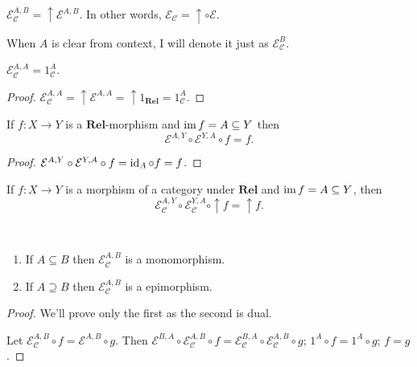 \begin{defn}
  $\mathcal{E}_{\mathcal{C}}^{A,B} = \uparrow \mathcal{E}^{A,B}$. In
  other words, $\mathcal{E}_{\mathcal{C}} = \uparrow \circ \mathcal{E}$.
  
  When $A$ is clear from context, I will denote it just as $\mathcal{E}_{\mathcal{C}}^B$.
\end{defn}

\begin{prop}
  $\mathcal{E}_{\mathcal{C}}^{A,A} = 1_{\mathcal{C}}^A$.
\end{prop}

\begin{proof}
  $\mathcal{E}_{\mathcal{C}}^{A,A} = \uparrow \mathcal{E}^{A,A} =
  \uparrow 1_{\mathbf{Rel}} = 1_{\mathcal{C}}^A$.
\end{proof}

\begin{prop}
  If $f : X \rightarrow Y$ is a $\mathbf{Rel}$-morphism and
  $\operatorname{im} f = A \subseteq Y$ then
  \[ \mathcal{E}^{A,Y} \circ \mathcal{E}^{Y,A} \circ f = f. \]
\end{prop}

\begin{proof}
  $\mathcal{E}^{A,Y} \circ \mathcal{E}^{Y,A} \circ f = \operatorname{id}_A
  \circ f = f$.
\end{proof}

\begin{cor}
  If $f : X \rightarrow Y$ is a morphism of a category under
  $\mathbf{Rel}$ and $\operatorname{im} f = A \subseteq Y$, then
  \[ \mathcal{E}_{\mathcal{C}}^{A,Y} \circ \mathcal{E}_{\mathcal{C}}^{Y,A}
  \circ \uparrow f = \uparrow f. \]
\end{cor}

\begin{prop}
  ~  
  \begin{enumerate}
    \item If $A \subseteq B$ then $\mathcal{E}_{\mathcal{C}}^{A,B}$ is a
    monomorphism.
    
    \item If $A \supseteq B$ then $\mathcal{E}_{\mathcal{C}}^{A,B}$ is a
    epimorphism.
  \end{enumerate}
\end{prop}

\begin{proof}
  We'll prove only the first as the second is dual.
  
  Let $\mathcal{E}_{\mathcal{C}}^{A,B} \circ f = \mathcal{E}^{A,B} \circ g$. Then
  $\mathcal{E}^{B,A} \circ \mathcal{E}_{\mathcal{C}}^{A,B}
  \circ f = \mathcal{E}_{\mathcal{C}}^{B,A} \circ \mathcal{E}_{\mathcal{C}}^{A,B} \circ g$;
  $1^A \circ f = 1^A \circ g$; $f = g$.
\end{proof}

